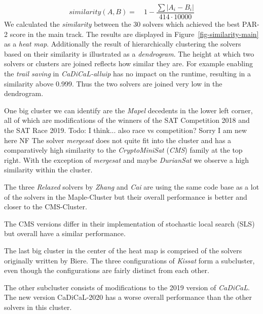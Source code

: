 \documentclass{elsarticle}
\newcommand{\todo}[1]{{\color{purple}Todo: #1}}
\begin{document}
\begin{equation}
\label{eq-similarity}
	similarity(A, B) =\quad 1 - \frac{\sum{|A_{i} - B_{i}|}}{414 \cdot 10000}
\end{equation}
We calculated the \emph{similarity} between the $30$ solvers which achieved the
best PAR-2 score in the main track. The results are displayed in
Figure~\ref{fig-similarity-main} as a \emph{heat map}. Additionally the result
of hierarchically clustering the solvers based on their similarity is
illustrated as a \emph{dendrogram}. The height at which two solvers or clusters
are joined reflects how similar they are. For example
enabling the \emph{trail saving} in \emph{CaDiCaL-alluip} has no impact on the
runtime, resulting in a similarity above \num{0.999}. Thus the two solvers are joined very low in the dendrogram.

One big cluster we can identify are the \emph{Mapel} decedents in the lower left
corner, all of which are modifications of the winners of the SAT Competition
2018 and the SAT Race 2019. \todo{I think... also race vs competition? Sorry I am new
  here NF} The solver \emph{mergesat} does not quite fit into the cluster and
has a comparatively high similarity to the \emph{CryptoMiniSat} (\emph{CMS})
family at the top right. With the exception of \emph{mergesat} and maybe
\emph{DurianSat} we observe a high similarity within the cluster.

The three \emph{Relaxed} solvers by \emph{Zhang} and \emph{Cai} are using the
same code base as a lot of the solvers in the Maple-Cluster but their overall
performance is better and closer to the CMS-Cluster.

The CMS versions differ in their implementation of stochastic local search (SLS)
but overall have a similar performance.

The last big cluster in the center of the heat map is comprised of the solvers
originally written by Biere. The three configurations of \emph{Kissat} form a
subcluster, even though the configurations are fairly distinct from each other.

The other subcluster consists of
modifications to the 2019 version of \emph{\mbox{CaDiCaL}}. The new version
CaDiCaL-2020 has a worse overall performance than
the other solvers in this cluster.
\end{document}
